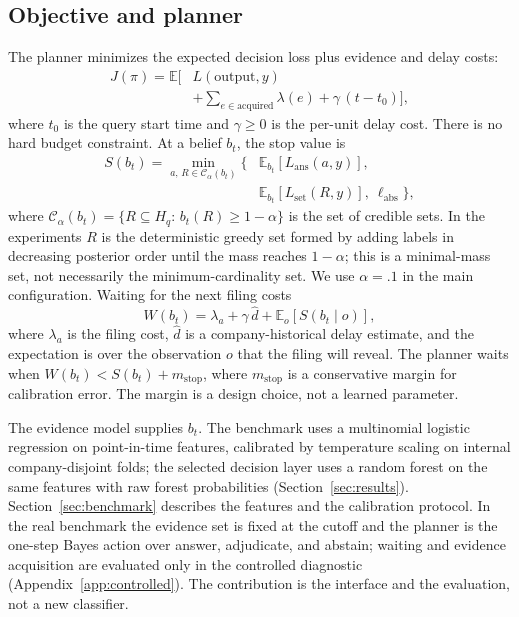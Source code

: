 \documentclass[11pt]{article}
\newcommand{\E}{\mathbb{E}}
\begin{document}
\subsection{Objective and planner}
The planner minimizes the expected decision loss plus evidence and delay costs:
\begin{equation}
\begin{split}
J(\pi)=\E\bigl[&L(\text{output},y)\\
&+\sum_{e\in\text{acquired}}\lambda(e)+\gamma\,(t-t_0)\bigr],
\end{split}
\label{eq:objective}
\end{equation}
where $t_0$ is the query start time and $\gamma\ge0$ is the per-unit delay cost. There is no hard budget constraint. At a belief $b_t$, the stop value is
\begin{equation}
\begin{split}
S(b_t)=\min_{a,\,R\in\mathcal C_\alpha(b_t)}\bigl\{&
\E_{b_t}[L_{\text{ans}}(a,y)],\\
&\E_{b_t}[L_{\text{set}}(R,y)],\ \ell_{\text{abs}}\bigr\},
\end{split}
\label{eq:stop}
\end{equation}
where \(\mathcal C_\alpha(b_t)=\{R\subseteq H_q:\,b_t(R)\ge 1-\alpha\}\) is the set of credible sets. In the experiments \(R\) is the deterministic greedy set formed by adding labels in decreasing posterior order until the mass reaches \(1-\alpha\); this is a minimal-mass set, not necessarily the minimum-cardinality set. We use $\alpha=.1$ in the main configuration. Waiting for the next filing costs
\begin{equation}
W(b_t)=\lambda_a+\gamma\,\hat d+\E_{o}\left[S(b_t\mid o)\right],
\label{eq:wait}
\end{equation}
where $\lambda_a$ is the filing cost, $\hat d$ is a company-historical delay estimate, and the expectation is over the observation $o$ that the filing will reveal. The planner waits when $W(b_t)<S(b_t)+m_{\text{stop}}$, where $m_{\text{stop}}$ is a conservative margin for calibration error. The margin is a design choice, not a learned parameter.

The evidence model supplies $b_t$. The benchmark uses a multinomial logistic regression on point-in-time features, calibrated by temperature scaling on internal company-disjoint folds; the selected decision layer uses a random forest on the same features with raw forest probabilities (Section~\ref{sec:results}). Section~\ref{sec:benchmark} describes the features and the calibration protocol. In the real benchmark the evidence set is fixed at the cutoff and the planner is the one-step Bayes action over answer, adjudicate, and abstain; waiting and evidence acquisition are evaluated only in the controlled diagnostic (Appendix~\ref{app:controlled}). The contribution is the interface and the evaluation, not a new classifier.
\end{document}
